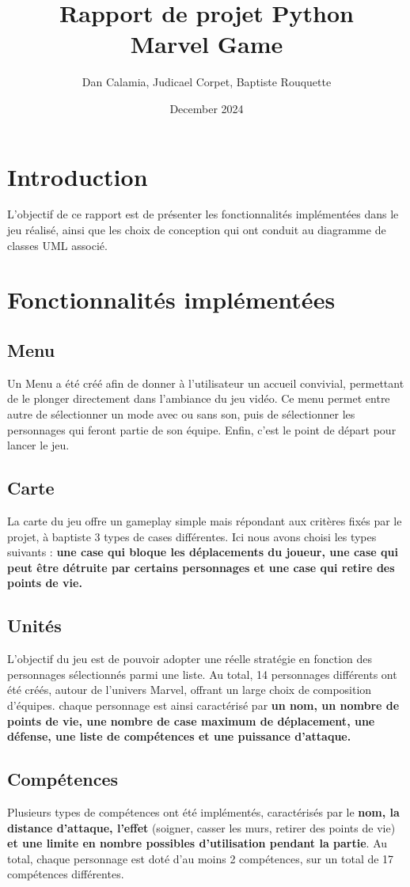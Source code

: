 \documentclass{article}
\title{Rapport de projet Python \\
Marvel Game}
\author{Dan Calamia,
Judicael Corpet,  
Baptiste Rouquette}
\date{December 2024}
\begin{document}
\maketitle

\section{Introduction}
L'objectif de ce rapport est de présenter les fonctionnalités implémentées dans le jeu réalisé, ainsi que les choix de conception qui ont conduit au diagramme de classes UML associé.

\section{Fonctionnalités implémentées}
\subsection{Menu}
Un Menu a été créé afin de donner à l'utilisateur un accueil convivial, permettant de le plonger directement dans l'ambiance du jeu vidéo. Ce menu permet entre autre de sélectionner un mode avec ou sans son, puis de sélectionner les personnages qui feront partie de son équipe. Enfin, c'est le point de départ pour lancer le jeu.

\subsection{Carte}
La carte du jeu offre un gameplay simple mais répondant aux critères fixés par le projet, à baptiste 3 types de cases différentes. Ici nous avons choisi les types suivants : \textbf{une case qui bloque les déplacements du joueur, une case qui peut être détruite par certains personnages et une case qui retire des points de vie.}

\subsection{Unités}
L'objectif du jeu est de pouvoir adopter une réelle stratégie en fonction des personnages sélectionnés parmi une liste. Au total, 14 personnages différents ont été créés, autour de l'univers Marvel, offrant un large choix de composition d'équipes. chaque personnage est ainsi caractérisé par \textbf{un nom, un nombre de points de vie, une nombre de case maximum de déplacement, une défense, une liste de compétences et une puissance d'attaque}\textbf{.}

\subsection{Compétences}
Plusieurs types de compétences ont été implémentés, caractérisés par le \textbf{nom, la distance d'attaque, l'effet }(soigner, casser les murs, retirer des points de vie) \textbf{et une limite en nombre possibles d'utilisation pendant la partie}. Au total, chaque personnage est doté d'au moins 2 compétences, sur un total de 17 compétences différentes.
\end{document}
